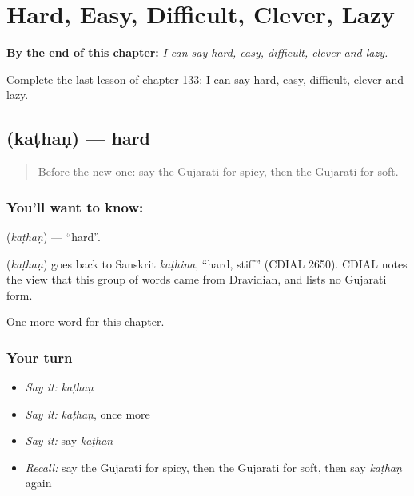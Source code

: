 
\chapter{Hard, Easy, Difficult, Clever, Lazy}
\label{ch:gu-hard-easy-difficult-clever-lazy}

\begin{chapteropening}
\textbf{By the end of this chapter:} \emph{I can say hard, easy, difficult, clever and lazy.}

Complete the last lesson of chapter 133: I can say hard, easy, difficult, clever and lazy.
\end{chapteropening}

\section[\texorpdfstring{\gu{કઠણ} (kaṭhaṇ)}{કઠણ (kaṭhaṇ)}]{ (kaṭhaṇ) — hard}

\label{lesson:GU-C133-kathan}



\begin{quote}
Before the new one: say the Gujarati for spicy, then the Gujarati for soft.
\end{quote}

\subsection*{You'll want to know: }
\textbf{} (\emph{kaṭhaṇ}) — \textquotedblleft{}hard\textquotedblright{}.

\begin{cousinweb}
\textbf{} (\emph{kaṭhaṇ}) goes back to Sanskrit \emph{kaṭhina}, \textquotedblleft{}hard, stiff\textquotedblright{} (CDIAL 2650). CDIAL notes the view that this group of words came from Dravidian, and lists no Gujarati form.
\end{cousinweb}

\begin{grammarlens}[title={What you've built}]
One more word for this chapter.
\end{grammarlens}

\subsection*{Your turn}
\begin{itemize}
\raggedright
  \item \emph{Say it:} \emph{kaṭhaṇ}
  \item \emph{Say it:} \emph{kaṭhaṇ}, once more
  \item \emph{Say it:} say \emph{kaṭhaṇ}
  \item \emph{Recall:} say the Gujarati for spicy, then the Gujarati for soft, then say \emph{kaṭhaṇ} again
\end{itemize}

